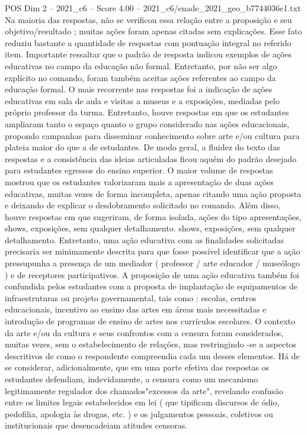 \begin{textsample}{POS Dim 2 – 2021\_c6 – Score 4.00 – 2021\_c6/enade\_2021\_geo\_b7744036e1.txt}
Na maioria das respostas, não se verificou essa relação entre a proposição e seu objetivo/resultado ; muitas ações foram apenas citadas sem explicações.
Esse fato reduziu bastante a quantidade de respostas com pontuação integral no referido item.
Importante ressaltar que o padrão de resposta indicou exemplos de ações educativas no campo da educação não formal.
Entretanto, por não ser algo explícito no comando, foram também aceitas ações referentes ao campo da educação formal.
O mais recorrente nas respostas foi a indicação de ações educativas em sala de aula e visitas a museus e a exposições, mediadas pelo próprio professor da turma.
Entretanto, houve respostas em que os estudantes ampliaram tanto o espaço quanto o grupo considerado nas ações educacionais, propondo campanhas para disseminar conhecimento sobre arte e/ou cultura para plateia maior do que a de estudantes.
De modo geral, a fluidez do texto das respostas e a consistência das ideias articuladas ficou aquém do padrão desejado para estudantes egressos do ensino superior.
O maior volume de respostas mostrou que os estudantes valorizaram mais a apresentação de duas ações educativas, muitas vezes de forma incompleta, apenas citando uma ação proposta e deixando de explicar o desdobramento solicitado no comando.
Além disso, houve respostas em que sugeriram, de forma isolada, ações do tipo apresentações, shows, exposições, sem qualquer detalhamento. shows, exposições, sem qualquer detalhamento.
Entretanto, uma ação educativa com as finalidades solicitadas precisaria ser minimamente descrita para que fosse possível identificar que a ação pressupunha a presença de um mediador ( professor / arte educador / museólogo ) e de receptores participativos.
A proposição de uma ação educativa também foi confundida pelos estudantes com a proposta de implantação de equipamentos de infraestruturas ou projeto governamental, tais como : escolas, centros educacionais, incentivo ao ensino das artes em áreas mais necessitadas e introdução de programas de ensino de artes nos currículos escolares.
O contexto da arte e/ou da cultura e seus confrontos com a censura foram considerados, muitas vezes, sem o estabelecimento de relações, mas restringindo -se a aspectos descritivos de como o respondente compreendia cada um desses elementos.
Há de se considerar, adicionalmente, que em uma parte efetiva das respostas os estudantes defendiam, indevidamente, a censura como um mecanismo legitimamente regulador dos chamados"excessos da arte", revelando confusão entre os limites legais estabelecidos em lei ( que tipificam discursos de ódio, pedofilia, apologia às drogas, etc. ) e os julgamentos pessoais, coletivos ou institucionais que desencadeiam atitudes censoras.

\end{textsample}
